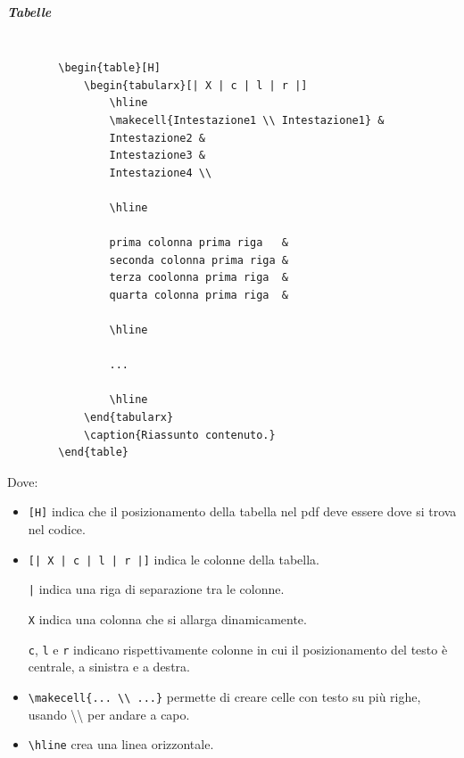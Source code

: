 \subparagraph{Tabelle}
\label{subpar:tabelle}
\begin{lstlisting}

        \begin{table}[H]
            \begin{tabularx}[| X | c | l | r |]
                \hline
                \makecell{Intestazione1 \\ Intestazione1} &
                Intestazione2 &
                Intestazione3 &
                Intestazione4 \\

                \hline

                prima colonna prima riga   &
                seconda colonna prima riga &
                terza coolonna prima riga  &
                quarta colonna prima riga  &

                \hline

                ...

                \hline
            \end{tabularx}
            \caption{Riassunto contenuto.}
        \end{table}
\end{lstlisting}
Dove:
\begin{itemize}
    \item \lstinline+[H]+ indica che il posizionamento della tabella nel pdf deve essere dove si trova nel codice.
    
    \item \lstinline+[| X | c | l | r |]+ indica le colonne della tabella.

    \lstinline+|+ indica una riga di separazione tra le colonne.

    \lstinline+X+ indica una colonna che si allarga dinamicamente.

    \lstinline+c+, \lstinline+l+ e \lstinline+r+ indicano rispettivamente colonne in cui il posizionamento del testo è centrale, a sinistra e a destra.
    
    \item \lstinline+\makecell{... \\ ...}+ permette di creare celle con testo su più righe, usando \textbackslash\textbackslash{} per andare a capo. 

    \item \lstinline+\hline+ crea una linea orizzontale.
\end{itemize}

